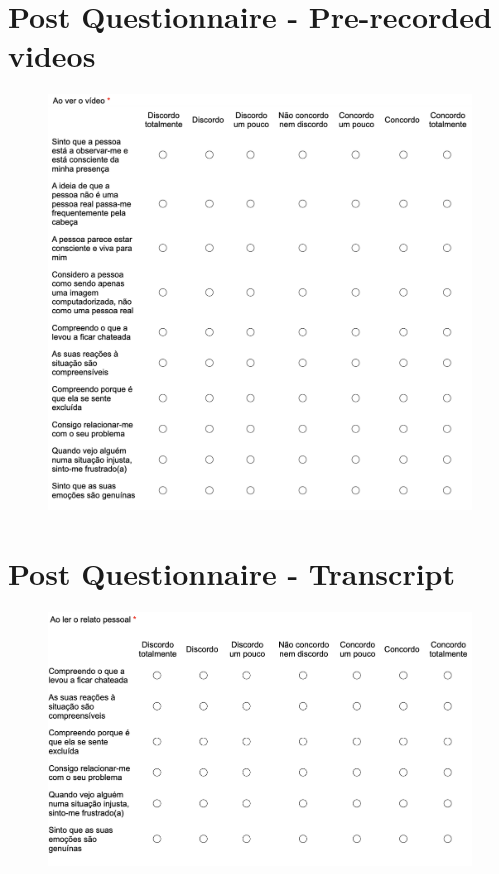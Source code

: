 \section{Post Questionnaire - Pre-recorded videos}
\begin{figure}[h!]
\includegraphics[scale=0.65]{figures/post.png}
\centering
\end{figure}

\clearpage
\section{Post Questionnaire - Transcript}
\begin{figure}[h!]
\includegraphics[scale=0.6]{figures/postTranscript.png}
\centering
\end{figure}